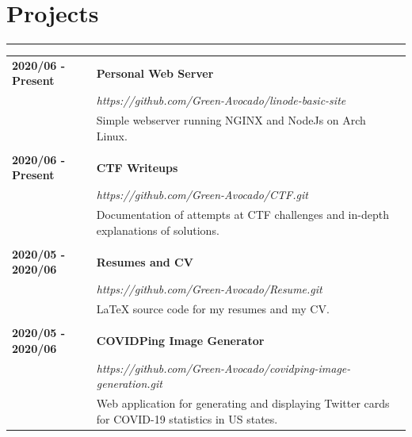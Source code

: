 \documentclass[letterpaper]{article}
\newcommand{\horizontalLine}{%
    \rule{\textwidth}{0.2pt}
    \vspace{1ex}
}
\begin{document}
    \section*{Projects}

        \horizontalLine

        \begin{tabular}{p{} p{}} 
            \textbf{2020/06 - Present} & \large\textbf{Personal Web Server} \\
            & \emph{https://github.com/Green-Avocado/linode-basic-site} \\
            & Simple webserver running NGINX and NodeJs on Arch Linux. \\
            \\
            \textbf{2020/06 - Present} & \large\textbf{CTF Writeups} \\
            & \emph{https://github.com/Green-Avocado/CTF.git} \\
            & Documentation of attempts at CTF challenges and in-depth explanations of solutions. \\
            \\
            \textbf{2020/05 - 2020/06} & \large\textbf{Resumes and CV} \\
            & \emph{https://github.com/Green-Avocado/Resume.git} \\
            & LaTeX source code for my resumes and my CV. \\
            \\
            \textbf{2020/05 - 2020/06} & \large\textbf{COVIDPing Image Generator} \\
            & \emph{https://github.com/Green-Avocado/covidping-image-generation.git} \\
            & Web application for generating and displaying Twitter cards for COVID-19 statistics in US states. \\
        \end{tabular}
\end{document}
